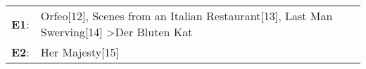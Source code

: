 \begin{supertabular}{p{0.03\textwidth}p{0.92\textwidth}}
 \textbf{E1}:  &                                                                                                                                                                                                                                                                                                                                                                                                                                                                                                                                                                        Orfeo[12]\textsuperscript{}, \enspace Scenes from an Italian Restaurant[13]\textsuperscript{}, \enspace Last Man Swerving[14]\textsuperscript{} \textgreater \enspace Der Bluten Kat\textsuperscript{}  \enspace  \\
 \textbf{E2}:  &                                                                                                                                                                                                                                                                                                                                                                                                                                                                                                                                                                                                                                                                                                                                             Her Majesty[15]\textsuperscript{}  \enspace  \\
\end{supertabular}
